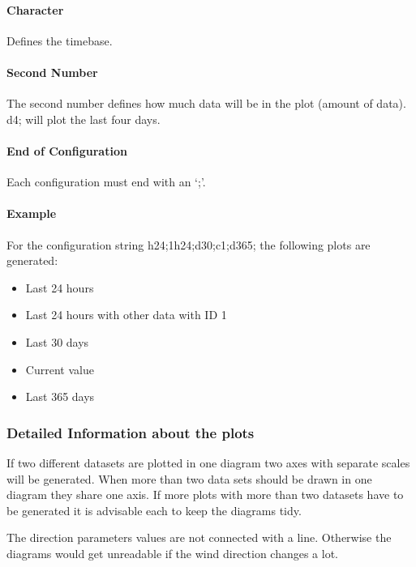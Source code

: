 \paragraph{Character} %
\label{par:character}
Defines the timebase.
\paragraph{Second Number} %
\label{par:number}
The second number defines how much data will be in the plot (amount of data). {\C d4;} will plot the last four days.
\paragraph{End of Configuration} %
\label{par:end_of_configuration}
Each configuration must end with an {\C `;'}.

\paragraph{Example} %
\label{par:example}
For the configuration string {\C h24;1h24;d30;c1;d365;} the following plots are generated:
\begin{itemize}
	\item Last 24 hours
	\item Last 24 hours with other data with ID 1 
	\item Last 30 days
	\item Current value
	\item Last 365 days
\end{itemize}


\subsubsection{Detailed Information about the plots} %
\label{ssub:detailed_information_about_the_plots}
If two different datasets are plotted in one diagram two axes with separate scales will be generated. When more than two data sets should be drawn in one diagram they share one axis. If more plots with more than two datasets have to be generated it is advisable each to keep the diagrams tidy.

The direction parameters values are not connected with a line. Otherwise the diagrams would get unreadable if the wind direction changes a lot.

